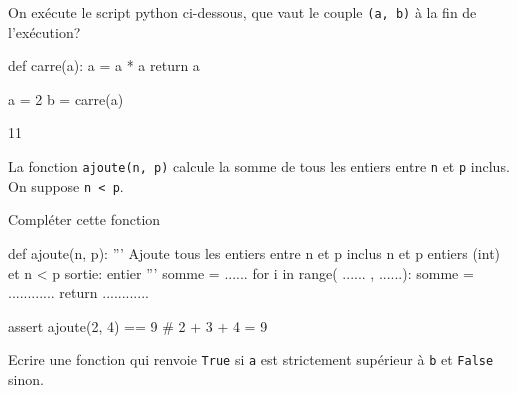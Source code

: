 \documentclass[a4paper,10pt]{report}
\def\ptsexoA{2}
\def\ptsexoB{2}
\def\ptsexoC{2}
\begin{document}

\renewcommand{\labelitemi}{\textbullet} %


\pagestyle{DS_FP}          %
\NomPrenomNote{}


\exods{\ptsexoA}


On exécute le script python ci-dessous, que vaut le couple \verb|(a, b)| à la fin de l'exécution?


\begin{CodePythontexAlt}[TaillePolice=\large,Largeur=1\linewidth,Centre,PremLigne=1]{}
def carre(a):
    a = a * a
    return a

a = 2
b = carre(a)
\end{CodePythontexAlt}


    \begin{answer}{1}{1}    \end{answer}

\medskip

\exods{\ptsexoB}

La fonction \verb|ajoute(n, p)| calcule la somme de tous les entiers entre \verb|n| et \verb|p| inclus. On suppose \verb|n < p|.

Compléter cette fonction

\begin{CodePythontexAlt}[TaillePolice=\large,Largeur=1\linewidth,Centre,PremLigne=1]{}
def ajoute(n, p):
    ''' Ajoute tous les entiers entre n et p inclus
    n et p entiers (int) et n < p
    sortie: entier '''
    somme = ...... 
    for i in range( ...... , ......):
        somme = ............
    return ............ 


assert ajoute(2, 4) == 9    # 2 + 3 + 4 = 9
    \end{CodePythontexAlt}


    \medskip

\exods{\ptsexoC}

Ecrire une fonction qui renvoie \verb|True| si \verb|a| est strictement supérieur à \verb|b| et \verb|False| sinon.
\end{document}
